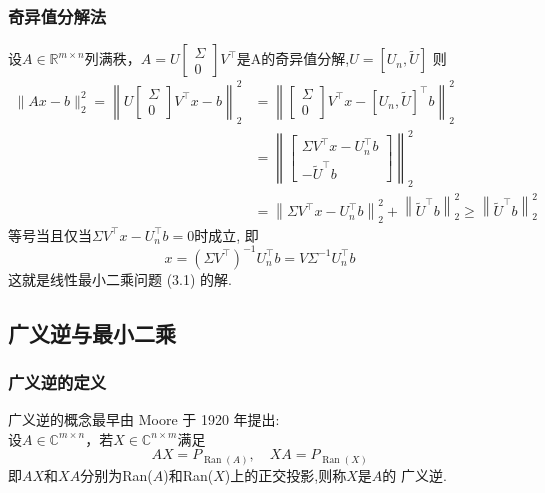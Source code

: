 \documentclass[12pt,a4paper]{article}
\begin{document}
\subsubsection{奇异值分解法}
设$A \in \mathbb{R}^{m \times n}$列满秩，$A=U\left[\begin{array}{l}{\Sigma} \\ {0}\end{array}\right] V^{\top}$是A的奇异值分解,$U=\left[U_{n}, \tilde{U}\right]$
则
$$
\begin{aligned}\|A x-b\|_{2}^{2}=\left\|U\left[\begin{array}{c}{\Sigma} \\ {0}\end{array}\right] V^{\top} x-b\right\|_{2}^{2} &=\left\|\left[\begin{array}{c}{\Sigma} \\ {0}\end{array}\right] V^{\top} x-\left[U_{n}, \tilde{U}\right]^{\top} b\right\|_{2}^{2} \\ &=\left\|\left[\begin{array}{c}{\Sigma V^{\top} x-U_{n}^{\top} b} \\ {-\tilde{U}^{\top} b}\end{array}\right]\right\|_{2}^{2} \\ &=\left\|\Sigma V^{\top} x-U_{n}^{\top} b\right\|_{2}^{2}+\left\|\tilde{U}^{\top} b\right\|_{2}^{2} \geq\left\|\tilde{U}^{\top} b\right\|_{2}^{2} \end{aligned}
$$
等号当且仅当$\Sigma V^{\top} x-U_{n}^{\top} b=0$时成立, 即
$$
x=\left(\Sigma V^{\top}\right)^{-1} U_{n}^{\top} b=V \Sigma^{-1} U_{n}^{\top} b
$$
这就是线性最小二乘问题 (3.1) 的解.
\subsection{广义逆与最小二乘}

\subsubsection{广义逆的定义}
\noindent 广义逆的概念最早由 Moore 于 1920 年提出:\\

设$A \in \mathbb{C}^{m \times n}$，若$X \in \mathbb{C}^{n \times m}$满足
\begin{equation}
A X=P_{\operatorname{Ran}(A)}, \quad X A=P_{\operatorname{Ran}(X)}
\end{equation}
即$AX$和$XA$分别为Ran($A$)和Ran($X$)上的正交投影,则称$X$是$A$的
广义逆.\\
\end{document}
